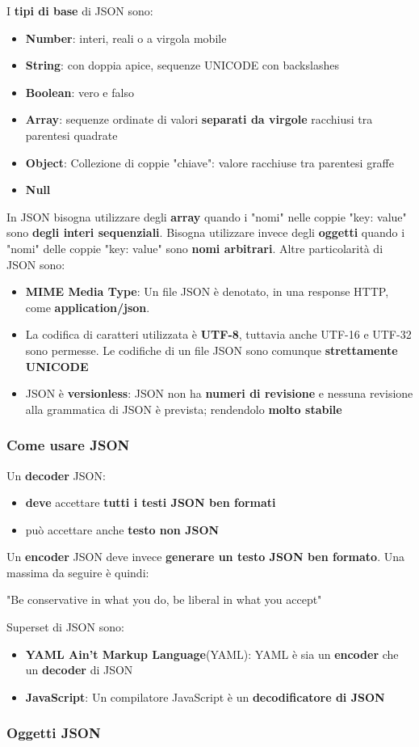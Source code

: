 \documentclass[12pt]{article}
\begin{document}
I \textbf{tipi di base} di JSON sono:
\begin{itemize}
    \item \textbf{Number}: interi, reali o a virgola mobile
    \item \textbf{String}: con doppia apice, sequenze UNICODE con backslashes
    \item \textbf{Boolean}: vero e falso
    \item \textbf{Array}: sequenze ordinate di valori \textbf{separati da virgole} racchiusi tra parentesi quadrate
    \item \textbf{Object}: Collezione di coppie "chiave": valore racchiuse tra parentesi graffe
    \item \textbf{Null}
\end{itemize}
In JSON bisogna utilizzare degli \textbf{array} quando i "nomi" nelle coppie "key: value" sono \textbf{degli interi sequenziali}.
Bisogna utilizzare invece degli \textbf{oggetti} quando i "nomi" delle coppie "key: value" sono \textbf{nomi arbitrari}.
Altre particolarità di JSON sono:
\begin{itemize}
    \item \textbf{MIME Media Type}: Un file JSON è denotato, in una response HTTP, come \textbf{application/json}.
    \item La codifica di caratteri utilizzata è \textbf{UTF-8}, tuttavia anche UTF-16 e UTF-32 sono permesse. Le codifiche di un file JSON sono comunque \textbf{strettamente UNICODE}
    \item JSON è \textbf{versionless}: JSON non ha \textbf{numeri di revisione} e nessuna revisione alla grammatica di JSON è prevista; rendendolo \textbf{molto stabile}
\end{itemize}
\subsubsection{Come usare JSON}
Un \textbf{decoder} JSON:
\begin{itemize}
    \item \textbf{deve} accettare \textbf{tutti i testi JSON ben formati}
    \item può accettare anche \textbf{testo non JSON}
\end{itemize}
Un \textbf{encoder} JSON deve invece \textbf{generare un testo JSON ben formato}. Una massima da seguire è quindi:
\begin{center}
    "Be conservative in what you do, be liberal in what you accept"
\end{center}
Superset di JSON sono:
\begin{itemize}
    \item \textbf{YAML Ain't Markup Language}(YAML): YAML è sia un \textbf{encoder} che un \textbf{decoder} di JSON
    \item \textbf{JavaScript}: Un compilatore JavaScript è un \textbf{decodificatore di JSON}
\end{itemize}
\subsubsection{Oggetti JSON}
\end{document}
